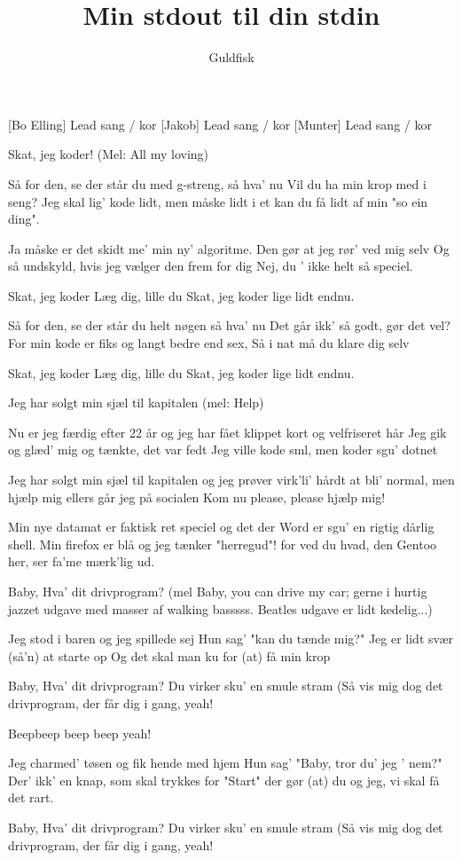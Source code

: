 \documentclass[a4paper,11pt]{article}
\title{Min stdout til din stdin}
\author{Guldfisk}
\begin{document}
\maketitle

\begin{roles}
[Bo Elling] Lead sang / kor
[Jakob] Lead sang / kor
[Munter] Lead sang / kor

\end{roles}

\scene Skat, jeg koder! (Mel: All my loving)

\begin{song}

 Så for den, se der står du
med g-streng, så hva' nu
Vil du ha min krop med i seng?
Jeg skal lig' kode lidt,
men måske lidt i et
kan du få lidt af min "so ein ding".

 Ja måske er det skidt me'
min ny' algoritme.
Den gør at jeg rør' ved mig selv
Og så undskyld, hvis jeg
vælger den frem for dig
Nej, du ' ikke helt så speciel.

 Skat, jeg koder
Læg dig, lille du
Skat, jeg koder
lige lidt endnu.

 Så for den, se der står du
helt nøgen så hva' nu
Det går ikk' så godt, gør det vel?
For min kode er fiks
og langt bedre end sex,
Så i nat må du klare dig selv

 Skat, jeg koder
Læg dig, lille du
Skat, jeg koder
lige lidt endnu.

\scene Jeg har solgt min sjæl til kapitalen (mel: Help)

 Nu er jeg færdig efter 22 år
og jeg har fået klippet kort og velfriseret hår
Jeg gik og glæd' mig og tænkte, det var fedt
Jeg ville kode sml, men koder sgu' dotnet

 Jeg har solgt min sjæl til kapitalen
og jeg prøver virk'li' hårdt at bli' normal, men
hjælp mig ellers går jeg på socialen
Kom nu please, please hjælp mig!

 Min nye datamat er faktisk ret speciel
og det der Word er sgu' en rigtig dårlig shell.
Min firefox er blå og jeg tænker "herregud"!
for ved du hvad, den Gentoo her, ser fa'me mærk'lig ud.

\scene Baby, Hva' dit drivprogram? (mel Baby, you can drive my car; gerne i hurtig jazzet udgave med masser af walking basssss. Beatles udgave er lidt kedelig...)

 Jeg stod i baren og jeg spillede sej
Hun sag'
"kan du tænde mig?"
Jeg er lidt svær (så'n) at starte op
Og det skal man ku for (at) få min krop

 Baby, Hva' dit drivprogram?
Du virker sku' en smule stram
(Så vis mig dog det drivprogram,
der får dig i gang, yeah!

 Beepbeep beep beep yeah!

 Jeg charmed' tøsen og fik hende med hjem
Hun sag'
"Baby, tror du' jeg ' nem?"
Der' ikk' en knap, som skal trykkes for "Start"
der gør (at) du og jeg, vi skal få det rart.

 Baby, Hva' dit drivprogram?
Du virker sku' en smule stram
(Så vis mig dog det drivprogram,
der får dig i gang, yeah!

\end{song}
\end{document}
